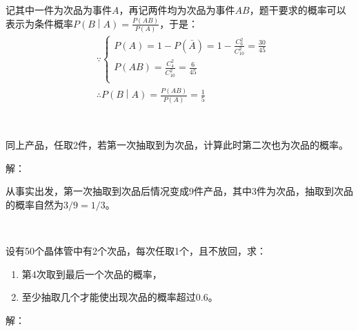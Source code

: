 记其中一件为次品为事件$A$，再记两件均为次品为事件$AB$，题干要求的概率可以表示为条件概率$P\left( B \middle| A \right) =\frac{P\left( AB \right)}{P\left( A \right)}$，于是：
\begin{align*}
& \because \begin{cases}
	P\left( A \right) =1-P\left( \bar{A} \right) =1-\frac{C_{6}^{2}}{C_{10}^{2}}=\frac{30}{45}\\
	P\left( AB \right) =\frac{C_{4}^{2}}{C_{10}^{2}}=\frac{6}{45}\\
\end{cases}
\\
& \therefore P\left( B \middle| A \right) =\frac{P\left( AB \right)}{P\left( A \right)}=\frac{1}{5}
\end{align*}

~

\begin{example}
同上产品，任取2件，若第一次抽取到为次品，计算此时第二次也为次品的概率。
\end{example}

解：

从事实出发，第一次抽取到次品后情况变成9件产品，其中3件为次品，抽取到次品的概率自然为$3/9=1/3$。

~

\begin{example}
设有50个晶体管中有2个次品，每次任取1个，且不放回，求：
\begin{enumerate}
    \item 第4次取到最后一个次品的概率，
    \item 至少抽取几个才能使出现次品的概率超过0.6。
\end{enumerate}
\end{example}

解：

